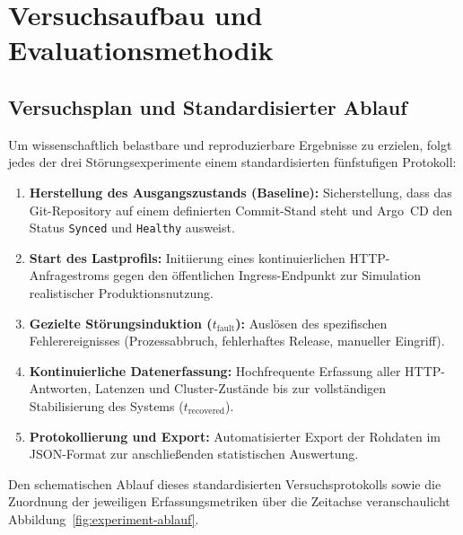 \chapter{Versuchsaufbau und Evaluationsmethodik}
\label{chap:versuchsaufbau-evaluationsmethodik}

\section{Versuchsplan und Standardisierter Ablauf}
\label{sec:versuchsplan}
Um wissenschaftlich belastbare und reproduzierbare Ergebnisse zu erzielen, folgt jedes der drei Störungsexperimente einem standardisierten fünfstufigen Protokoll:
\begin{enumerate}
    \item \textbf{Herstellung des Ausgangszustands (Baseline):} Sicherstellung, dass das Git-Repository auf einem definierten Commit-Stand steht und Argo~CD den Status \texttt{Synced} und \texttt{Healthy} ausweist.
    \item \textbf{Start des Lastprofils:} Initiierung eines kontinuierlichen HTTP-Anfragestroms gegen den öffentlichen Ingress-Endpunkt zur Simulation realistischer Produktionsnutzung.
    \item \textbf{Gezielte Störungsinduktion ($t_{\text{fault}}$):} Auslösen des spezifischen Fehlerereignisses (Prozessabbruch, fehlerhaftes Release, manueller Eingriff).
    \item \textbf{Kontinuierliche Datenerfassung:} Hochfrequente Erfassung aller HTTP-Antworten, Latenzen und Cluster-Zustände bis zur vollständigen Stabilisierung des Systems ($t_{\text{recovered}}$).
    \item \textbf{Protokollierung und Export:} Automatisierter Export der Rohdaten im JSON-Format zur anschließenden statistischen Auswertung.
\end{enumerate}

Den schematischen Ablauf dieses standardisierten Versuchsprotokolls sowie die Zuordnung der jeweiligen Erfassungsmetriken über die Zeitachse veranschaulicht Abbildung~\ref{fig:experiment-ablauf}.



